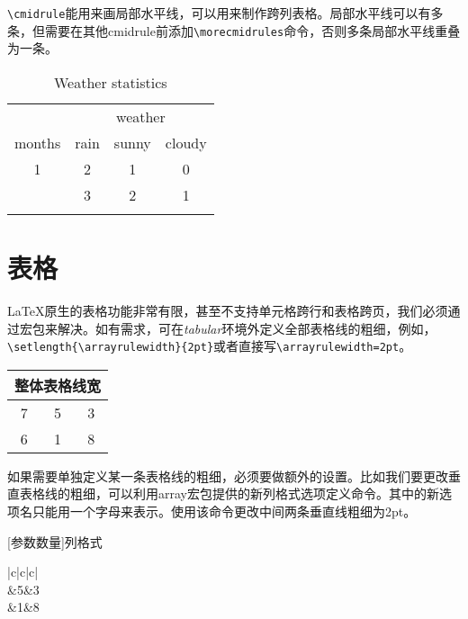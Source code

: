 \lstinline|\cmidrule|能用来画局部水平线，可以用来制作跨列表格。局部水平线可以有多条，但需要在其他cmidrule前添加\lstinline|\morecmidrules|命令，否则多条局部水平线重叠为一条。

\begin{table}[!htb]
    \centering
    \caption{Weather statistics}
    \begin{tabular}{cccc}
        \toprule[2pt]
        & \multicolumn{3}{c}{weather}\\
        \cmidrule{2-4}
        \morecmidrules\cmidrule{2-4}
        months & rain & sunny & cloudy\\
        \midrule
        1 & 2 & 1 & 0\\
        \midrule
        \addlinespace[5pt]%
        2 & 3 & 2 & 1\\
        \addlinespace[5pt]
        \bottomrule
    \end{tabular}
\end{table}

\section{表格}
\LaTeX 原生的表格功能非常有限，甚至不支持单元格跨行和表格跨页，我们必须通过宏包来解决。如有需求，可在\emph{tabular}环境外定义全部表格线的粗细，例如，\lstinline|\setlength{\arrayrulewidth}{2pt}|或者直接写\lstinline|\arrayrulewidth=2pt|。

\begin{codeshow}
\centering
\arrayrulewidth=1pt%
\begin{tabular}
    {|c|c|c|}
    \hline
    \multicolumn{3}{|c|}{整体表格线宽}\\
    \hline
    7 & 5 & 3 \\
    \hline
    6 & 1 & 8 \\
    \hline
\end{tabular}
\end{codeshow}

如果需要单独定义某一条表格线的粗细，必须要做额外的设置。比如我们要更改垂直表格线的粗细，可以利用array宏包提供的新列格式选项定义命令。其中的新选项名只能用一个字母来表示。使用该命令更改中间两条垂直线粗细为2pt。

\begin{latex}
\newcolumntype{新选项名称}[参数数量]{列格式}
\end{latex}

\begin{codeshow}
\centering
{}
\begin{tabular}
    {|c|c|c|}
    \hline
    \\
    &5&3\\
    &1&8\\
    \hline
\end{tabular}
\end{codeshow}

